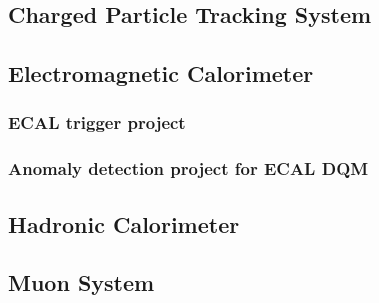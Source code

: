 \subsection{Charged Particle Tracking System}
\label{tracker}

\subsection{Electromagnetic Calorimeter}
\label{Ecal}

\subsubsection{ECAL trigger project}
\label{Ecal_trigger}


\subsubsection{Anomaly detection project for ECAL DQM}
\label{Ecal_DQM}

\subsection{Hadronic Calorimeter}
\label{Hcal}

\subsection{Muon System}
\label{muon_system}

